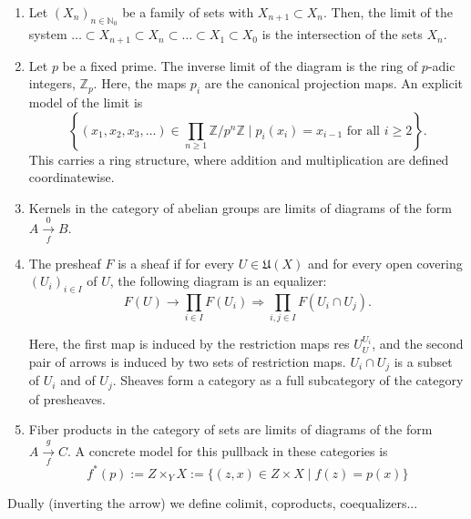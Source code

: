 \begin{example}[Limits]
    \begin{enumerate}
        \item Let $\left(X_n\right)_{n \in \mathbb{N}_0}$ be a family of sets with $X_{n+1} \subset X_n$. Then, the limit of the system
        $
        \ldots \subset X_{n+1} \subset X_n \subset \ldots \subset X_1 \subset X_0
        $
        is the intersection of the sets $X_n$.
        \item Let $p$ be a fixed prime. The inverse limit of the diagram
        is the ring of $p$-adic integers, $\mathbb{Z}_p$. Here, the maps $p_i$ are the canonical projection maps. An explicit model of the limit is
        $$
        \left\{\left(x_1, x_2, x_3, \ldots\right) \in \prod_{n \geq 1} \mathbb{Z} / p^n \mathbb{Z} \mid p_i\left(x_i\right)=x_{i-1} \text { for all } i \geq 2\right\} .
        $$
        This carries a ring structure, where addition and multiplication are defined coordinatewise.
        \item Kernels in the category of abelian groups are limits of diagrams of the form $A \underset{f}{\stackrel{0}{\longrightarrow}} B$.
        \item The presheaf $F$ is a sheaf if for every $U \in \mathfrak{U}(X)$ and for every open covering $\left(U_i\right)_{i \in I}$ of $U$, the following diagram is an equalizer:
        $$
        F(U) \longrightarrow \prod_{i \in I} F\left(U_i\right) \Longrightarrow \prod_{i, j \in I} F\left(U_i \cap U_j\right) .
        $$
        
        Here, the first map is induced by the restriction maps res $U_U^{U_i}$, and the second pair of arrows is induced by two sets of restriction maps. $U_i \cap U_j$ is a subset of $U_i$ and of $U_j$.
        Sheaves form a category as a full subcategory of the category of presheaves.
        \item Fiber products in the category of sets are limits of diagrams of the form $A \underset{f}{\stackrel{g}{\longrightarrow}} C$. A concrete model for this pullback in these categories is $$f^*(p):=Z \times_Y X:=\{(z, x) \in Z \times X \mid f(z)=p(x)\}$$
    \end{enumerate}
\end{example}


Dually (inverting the arrow) we define colimit, coproducts, coequalizers...\\

